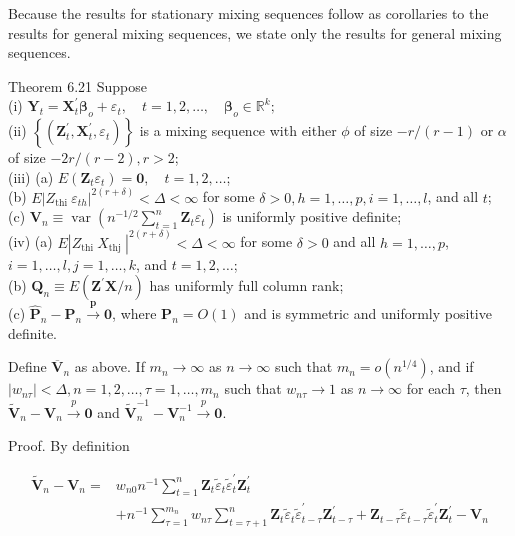 \documentclass[10pt]{article}
\begin{document}
Because the results for stationary mixing sequences follow as corollaries to the results for general mixing sequences, we state only the results for general mixing sequences.

Theorem 6.21 Suppose\\
(i) $\mathbf{Y}_{t}=\mathbf{X}_{t}^{\prime} \boldsymbol{\beta}_{o}+\varepsilon_{t}, \quad t=1,2, \ldots, \quad \boldsymbol{\beta}_{o} \in \mathbb{R}^{k} ;$\\
(ii) $\left\{\left(\mathbf{Z}_{t}^{\prime}, \mathbf{X}_{t}^{\prime}, \varepsilon_{t}\right)\right\}$ is a mixing sequence with either $\phi$ of size $-r /(r-1)$ or $\alpha$ of size $-2 r /(r-2), r>2$;\\
(iii) (a) $E\left(\mathbf{Z}_{t} \varepsilon_{t}\right)=\mathbf{0}, \quad t=1,2, \ldots$;\\
(b) $E\left|Z_{\text {thi }} \varepsilon_{t h}\right|^{2(r+\delta)}<\Delta<\infty$ for some $\delta>0, h=1, \ldots, p, i= 1, \ldots, l$, and all $t$;\\
(c) $\mathbf{V}_{n} \equiv \operatorname{var}\left(n^{-1 / 2} \sum_{t=1}^{n} \mathbf{Z}_{t} \varepsilon_{t}\right)$ is uniformly positive definite;\\
(iv) (a) $E\left|Z_{\text {thi }} X_{\text {thj }}\right|^{2(r+\delta)}<\Delta<\infty$ for some $\delta>0$ and all $h=1, \ldots, p$, $i=1, \ldots, l, j=1, \ldots, k$, and $t=1,2, \ldots$;\\
(b) $\mathbf{Q}_{n} \equiv E\left(\mathbf{Z}^{\prime} \mathbf{X} / n\right)$ has uniformly full column rank;\\
(c) $\hat{\mathbf{P}}_{n}-\mathbf{P}_{n} \xrightarrow{\boldsymbol{p}} \mathbf{0}$, where $\mathbf{P}_{n}=O(1)$ and is symmetric and uniformly positive definite.

Define $\overline{\mathbf{V}}_{n}$ as above. If $m_{n} \rightarrow \infty$ as $n \rightarrow \infty$ such that $m_{n}=o\left(n^{1 / 4}\right)$, and if $\left|w_{n \tau}\right|<\Delta, n=1,2, \ldots, \tau=1, \ldots, m_{n}$ such that $w_{n \tau} \rightarrow 1$ as $n \rightarrow \infty$ for each $\tau$, then $\tilde{\mathbf{V}}_{n}-\mathbf{V}_{n} \xrightarrow{p} \mathbf{0}$ and $\tilde{\mathbf{V}}_{n}^{-1}-\mathbf{V}_{n}^{-1} \xrightarrow{p} \mathbf{0}$.

Proof. By definition

$$
\begin{aligned}
\tilde{\mathbf{V}}_{n}-\mathbf{V}_{n}= & w_{n 0} n^{-1} \sum_{t=1}^{n} \mathbf{Z}_{t} \tilde{\varepsilon}_{t} \tilde{\varepsilon}_{t}^{\prime} \mathbf{Z}_{t}^{\prime} \\
& +n^{-1} \sum_{\tau=1}^{m_{n}} w_{n \tau} \sum_{t=\tau+1}^{n} \mathbf{Z}_{t} \tilde{\varepsilon}_{t} \tilde{\varepsilon}_{t-\tau}^{\prime} \mathbf{Z}_{t-\tau}^{\prime}+\mathbf{Z}_{t-\tau} \tilde{\varepsilon}_{t-\tau} \tilde{\varepsilon}_{t}^{\prime} \mathbf{Z}_{t}^{\prime}-\mathbf{V}_{n}
\end{aligned}
$$
\end{document}
